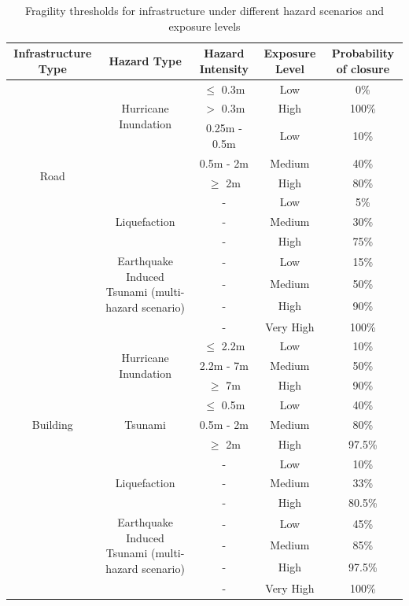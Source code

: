 \documentclass[review,3p,times,onecolumn,sort&compress,12pt]{elsarticle}
\begin{document}
\begin{table}[h!]
\small
\caption{Fragility thresholds for infrastructure under different hazard scenarios and exposure levels}
\begin{center}
\label{tab: fragility}
\begin{tabular}{ c|c|c|c|c } 
Infrastructure Type & Hazard Type & Hazard Intensity & Exposure Level & Probability of closure \\ 
\hline
\multirow{9}{4em}{Road} & \multirow{3}{4cm}{Hurricane Inundation} & $\leq$ 0.3m & Low & 0\% \\ 
& & $>$ 0.3m & High & 100\% \\ 
\cline{2-5}
& \multirow{3}{4cm}{Tsunami} & 0.25m - 0.5m & Low & 10\% \\ 
& & 0.5m - 2m & Medium & 40\% \\ 
& & $\geq$ 2m & High & 80\% \\ 
\cline{2-5}
& \multirow{3}{4cm}{Liquefaction} & - & Low & 5\% \\ 
& & - & Medium & 30\% \\ 
& & - & High & 75\% \\ 
\cline{2-5}
& \multirow{3}{4cm}{Earthquake Induced Tsunami (multi-hazard scenario)} & - & Low & 15\% \\ 
& & - & Medium & 50\% \\ 
& & - & High & 90\% \\ 
& & - & Very High & 100\% \\ 
\hline
\multirow{9}{4em}{Building} & \multirow{3}{4cm}{Hurricane Inundation} & $\leq$ 2.2m & Low & 10\% \\ 
& & 2.2m - 7m & Medium & 50\% \\ 
& & $\geq$ 7m & High & 90\% \\ 
\cline{2-5}
& \multirow{3}{4cm}{Tsunami} & $\leq$ 0.5m & Low & 40\% \\ 
& & 0.5m - 2m & Medium & 80\% \\ 
& & $\geq$ 2m & High & 97.5\% \\ 
\cline{2-5}
& \multirow{3}{4cm}{Liquefaction} & - & Low & 10\% \\ 
& & - & Medium & 33\% \\ 
& & - & High & 80.5\% \\ 
\cline{2-5}
& \multirow{3}{4cm}{Earthquake Induced Tsunami (multi-hazard scenario)} & - & Low & 45\% \\ 
& & - & Medium & 85\% \\ 
& & - & High & 97.5\% \\ 
& & - & Very High & 100\% \\ 
\end{tabular}
\end{center}
\end{table}
\end{document}
